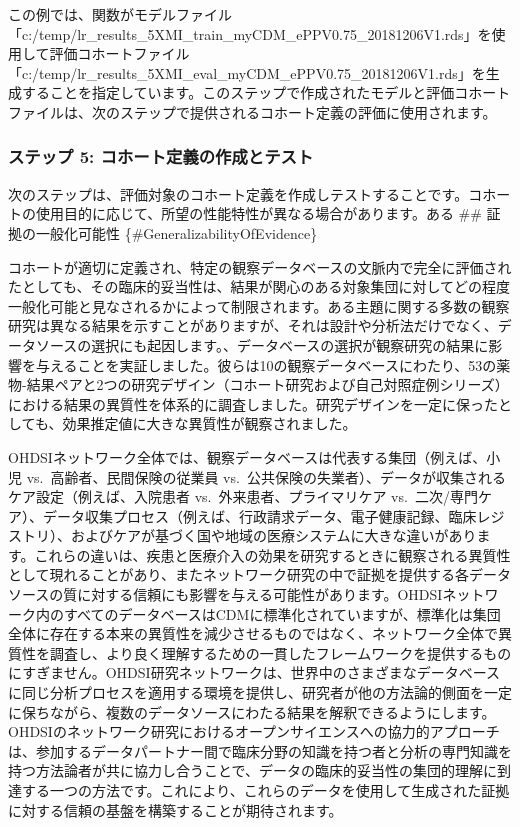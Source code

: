 \documentclass[
  11pt]{book}
\theoremstyle{definition}
\theoremstyle{definition}
\theoremstyle{definition}
\theoremstyle{definition}
\theoremstyle{remark}
\begin{document}
この例では、関数がモデルファイル「c:/temp/lr\_results\_5XMI\_train\_myCDM\_ePPV0.75\_20181206V1.rds」を使用して評価コホートファイル「c:/temp/lr\_results\_5XMI\_eval\_myCDM\_ePPV0.75\_20181206V1.rds」を生成することを指定しています。このステップで作成されたモデルと評価コホートファイルは、次のステップで提供されるコホート定義の評価に使用されます。

\subsubsection*{ステップ 5: コホート定義の作成とテスト}\label{ux30b9ux30c6ux30c3ux30d7-5-ux30b3ux30dbux30fcux30c8ux5b9aux7fa9ux306eux4f5cux6210ux3068ux30c6ux30b9ux30c8}

次のステップは、評価対象のコホート定義を作成しテストすることです。コホートの使用目的に応じて、所望の性能特性が異なる場合があります。ある
\#\# 証拠の一般化可能性 \{\#GeneralizabilityOfEvidence\}

コホートが適切に定義され、特定の観察データベースの文脈内で完全に評価されたとしても、その臨床的妥当性は、結果が関心のある対象集団に対してどの程度一般化可能と見なされるかによって制限されます。ある主題に関する多数の観察研究は異なる結果を示すことがありますが、それは設計や分析法だけでなく、データソースの選択にも起因します。\citet{madigan_2013は}、データベースの選択が観察研究の結果に影響を与えることを実証しました。彼らは10の観察データベースにわたり、53の薬物-結果ペアと2つの研究デザイン（コホート研究および自己対照症例シリーズ）における結果の異質性を体系的に調査しました。研究デザインを一定に保ったとしても、効果推定値に大きな異質性が観察されました。

OHDSIネットワーク全体では、観察データベースは代表する集団（例えば、小児 vs.~高齢者、民間保険の従業員 vs.~公共保険の失業者）、データが収集されるケア設定（例えば、入院患者 vs.~外来患者、プライマリケア vs.~二次/専門ケア）、データ収集プロセス（例えば、行政請求データ、電子健康記録、臨床レジストリ）、およびケアが基づく国や地域の医療システムに大きな違いがあります。これらの違いは、疾患と医療介入の効果を研究するときに観察される異質性として現れることがあり、またネットワーク研究の中で証拠を提供する各データソースの質に対する信頼にも影響を与える可能性があります。OHDSIネットワーク内のすべてのデータベースはCDMに標準化されていますが、標準化は集団全体に存在する本来の異質性を減少させるものではなく、ネットワーク全体で異質性を調査し、より良く理解するための一貫したフレームワークを提供するものにすぎません。OHDSI研究ネットワークは、世界中のさまざまなデータベースに同じ分析プロセスを適用する環境を提供し、研究者が他の方法論的側面を一定に保ちながら、複数のデータソースにわたる結果を解釈できるようにします。OHDSIのネットワーク研究におけるオープンサイエンスへの協力的アプローチは、参加するデータパートナー間で臨床分野の知識を持つ者と分析の専門知識を持つ方法論者が共に協力し合うことで、データの臨床的妥当性の集団的理解に到達する一つの方法です。これにより、これらのデータを使用して生成された証拠に対する信頼の基盤を構築することが期待されます。
\end{document}
